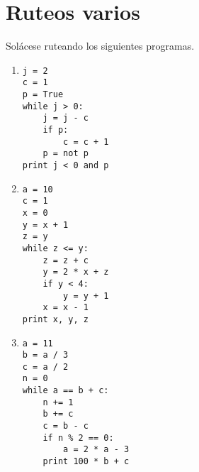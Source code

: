 \section{Ruteos varios}

\noindent
Solácese ruteando los siguientes programas.

\begin{enumerate}
\item
\begin{lstlisting}
j = 2
c = 1
p = True
while j > 0:
    j = j - c
    if p:
        c = c + 1
    p = not p
print j < 0 and p
\end{lstlisting}

\item
\begin{lstlisting}
a = 10
c = 1
x = 0
y = x + 1
z = y
while z <= y:
    z = z + c
    y = 2 * x + z
    if y < 4:
        y = y + 1
    x = x - 1
print x, y, z
\end{lstlisting}

\item
\begin{lstlisting}
a = 11
b = a / 3
c = a / 2
n = 0
while a == b + c:
    n += 1
    b += c
    c = b - c
    if n % 2 == 0:
        a = 2 * a - 3
    print 100 * b + c
\end{lstlisting}

\end{enumerate}
